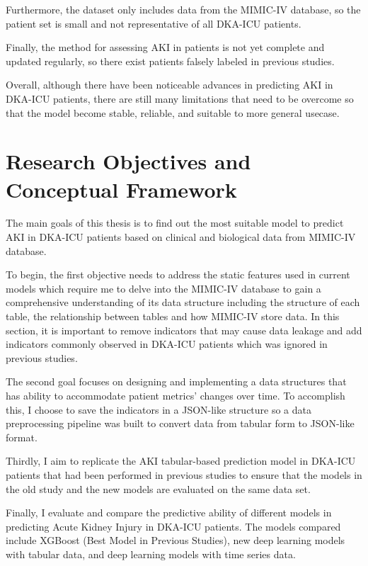 \documentclass[../main.tex]{subfiles}
\begin{document}
Furthermore, the dataset only includes data from the \gls{MIMIC-IV} database, so the patient set is small and not representative of all \gls{DKA-ICU} patients.

Finally, the method for assessing \gls{AKI} in patients is not yet complete and updated regularly, so there exist patients falsely labeled in previous studies.

Overall, although there have been noticeable advances in predicting \gls{AKI} in \gls{DKA-ICU} patients, there are still many limitations that need to be overcome so that the model become stable, reliable, and suitable to more general usecase.



\section{Research Objectives and Conceptual Framework}

The main goals of this thesis is to find out the most suitable model to predict \gls{AKI} in \gls{DKA-ICU} patients based on clinical and biological data from \gls{MIMIC-IV} database.

To begin, the first objective needs to address the static features used  in current models which require me to delve into the \gls{MIMIC-IV} database to gain a comprehensive understanding of its data structure including the structure of each table, the relationship between tables and how \gls{MIMIC-IV} store data.
In this section, it is important to remove indicators that may cause data leakage and add indicators commonly observed in \gls{DKA-ICU} patients which was ignored in previous studies.

The second goal focuses on designing and implementing a data structures that has ability to accommodate patient metrics' changes over time.
To accomplish this, I choose to save the indicators in a JSON-like structure so a data preprocessing pipeline was built to convert data from tabular form to JSON-like format.

Thirdly, I aim to replicate the \gls{AKI} tabular-based prediction model in \gls{DKA-ICU} patients that had been performed in previous studies to ensure that the models in the old study and the new models are evaluated on the same data set.

Finally, I evaluate and compare the predictive ability of different models in predicting Acute Kidney Injury in \gls{DKA-ICU} patients.
The models compared include XGBoost (Best Model in Previous Studies), new deep learning models with tabular data, and deep learning models with time series data.
\end{document}
